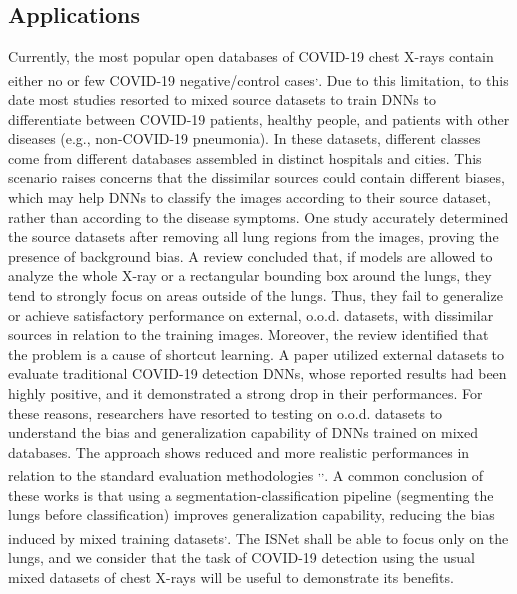 \documentclass[fleqn,10pt]{wlscirep}
\begin{document}
\subsection{Applications}

Currently, the most popular open databases of COVID-19 chest X-rays contain either no or few COVID-19 negative/control cases\cite{GitCovidSet}\textsuperscript{,}\cite{BrixiaSet}. Due to this limitation, to this date most studies resorted to mixed source datasets to train DNNs to differentiate between COVID-19 patients, healthy people, and patients with other diseases (e.g., non-COVID-19 pneumonia). In these datasets, different classes come from different databases assembled in distinct hospitals and cities. This scenario raises concerns that the dissimilar sources could contain different biases, which may help DNNs to classify the images according to their source dataset, rather than according to the disease symptoms. One study\cite{critic} accurately determined the source datasets after removing all lung regions from the images, proving the presence of background bias. A review\cite{ShortcutCovid} concluded that, if models are allowed to analyze the whole X-ray or a rectangular bounding box around the lungs, they tend to strongly focus on areas outside of the lungs. Thus, they fail to generalize or achieve satisfactory performance on external, o.o.d. datasets, with dissimilar sources in relation to the training images. Moreover, the review identified that the problem is a cause of shortcut learning\cite{ShortcutLearning}. A paper\cite{NatureCovidBias} utilized external datasets to evaluate traditional COVID-19 detection DNNs, whose reported results had been highly positive, and it demonstrated a strong drop in their performances. For these reasons, researchers have resorted to testing on o.o.d. datasets to understand the bias and generalization capability of DNNs trained on mixed databases. The approach shows reduced and more realistic performances in relation to the standard evaluation methodologies \cite{ShortcutCovid}\textsuperscript{,}\cite{bassi2021covid19}\textsuperscript{,}\cite{covidSegmentation}.  A common conclusion of these works is that using a segmentation-classification pipeline (segmenting the lungs before classification) improves generalization capability, reducing the bias induced by mixed training datasets\cite{bassi2021covid19}\textsuperscript{,}\cite{covidSegmentation}. The ISNet shall be able to focus only on the lungs, and we consider that the task of COVID-19 detection using the usual mixed datasets of chest X-rays will be useful to demonstrate its benefits.
\end{document}
